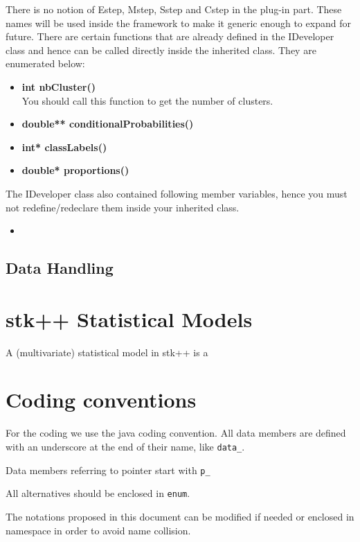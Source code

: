 \documentclass[a4paper,11pt]{article}
\begin{document}
There is no notion of Estep, Mstep, Sstep and Cstep in the plug-in part. These names will be used inside the framework to make
it generic enough to expand for future. There are certain functions that are already defined in the IDeveloper 
class and hence can be called directly inside the inherited class. 
They are enumerated below:
\begin{itemize}
 \item {\bf int nbCluster()}\\
You should call this function to get the number of clusters.
\item {\bf double** conditionalProbabilities()}\\
\item {\bf int* classLabels()}\\
\item {\bf double* proportions()}\\
\end{itemize}

The IDeveloper class also contained following member variables, hence you must not redefine/redeclare them inside your inherited class.
\begin{itemize}
 \item 
\end{itemize}

\subsection{Data Handling}
\label{datahandling}
\section{stk++ Statistical Models}

A (multivariate) statistical model in stk++ is a


\appendix

\section{Coding conventions}

For the coding we use the java coding convention. All data members
are defined with an underscore at the end of their name, like \verb+data_+.

Data members referring to pointer start with \verb+p_+

All alternatives should be enclosed in \verb+enum+.

The notations proposed in this document can be modified if needed
or enclosed in namespace in order to avoid name collision.
\end{document}
